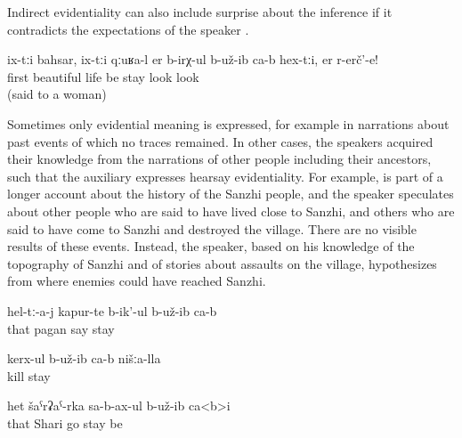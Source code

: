 Indirect evidentiality can also include surprise about the inference if it contradicts the expectations of the speaker .
%
\begin{exe}
	\ex	\label{ex:(It turned out) they lived well first, look@15}
	\gll	ix-tːi	bahsar,	ix-tːi	qːuʁa-l	er b-irχ-ul	b-už-ib ca-b	hex-tːi,	er	r-erč'-e!\\
			first		beautiful	life be	stay 		look	look\\
	\glt	{} (said to a woman)
\end{exe}

Sometimes only evidential meaning is expressed, for example in narrations about past events of which no traces remained. In other cases, the speakers acquired their knowledge from the narrations of other people including their ancestors, such that the auxiliary expresses hearsay evidentiality. For example,  is part of a longer account about the history of the Sanzhi people, and the speaker speculates about other people who are said to have lived close to Sanzhi, and others who are said to have come to Sanzhi and destroyed the village. There are no visible results of these events. Instead, the speaker, based on his knowledge of the topography of Sanzhi and of stories about assaults on the village, hypothesizes from where enemies could have reached Sanzhi.
%
\begin{exe}
	\ex	\label{ex:pagans invaded from Shari}
	\begin{xlist}
		\ex	\label{ex:They were (apparently) called pagans}
		\gll	hel-tː-a-j	kapur-te	b-ik'-ul	b-už-ib	ca-b\\
			that	pagan	say	stay	\\
		\glt	{}
	
		\ex	\label{ex:They apparently killed our (people)}
		\gll	kerx-ul	b-už-ib	ca-b		nišːa-lla\\
			kill	stay			\\
		\glt	{}
	
		\ex	\label{ex:They came from Shari (to us)@16}
		\gll	het	šaˁrʡaˁ-rka	sa-b-ax-ul	b-už-ib ca<b>i\\
			that	Shari	go	stay be\\
		\glt	{}
	\end{xlist}
\end{exe}

